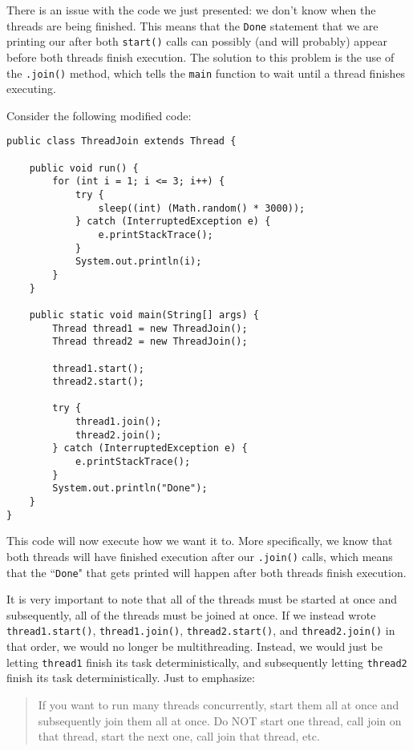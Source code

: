 There is an issue with the code we just presented: we don't know when the threads are being finished. This means that the \verb!Done! statement that we are printing our after both \verb!start()! calls can possibly (and will probably) appear before both threads finish execution. The solution to this problem is the use of the \verb!.join()! method, which tells the \verb!main! function to wait until a thread finishes executing. 

Consider the following modified code:

\begin{lstlisting}
public class ThreadJoin extends Thread {

	public void run() {
		for (int i = 1; i <= 3; i++) {
			try {
				sleep((int) (Math.random() * 3000));
			} catch (InterruptedException e) {
				e.printStackTrace();
			}
			System.out.println(i);
		}
	}

	public static void main(String[] args) {
		Thread thread1 = new ThreadJoin();
		Thread thread2 = new ThreadJoin();

		thread1.start();
		thread2.start();

		try {
			thread1.join();
			thread2.join();
		} catch (InterruptedException e) {
			e.printStackTrace();
		}
		System.out.println("Done");
	}
}
\end{lstlisting}

This code will now execute how we want it to. More specifically, we know that both threads will have finished execution after our \verb!.join()! calls, which means that the ``\verb!Done!" that gets printed will happen after both threads finish execution. 

It is very important to note that all of the threads must be started at once and subsequently, all of the threads must be joined at once. If we instead wrote \verb!thread1.start()!, \verb!thread1.join()!, \verb!thread2.start()!, and \verb!thread2.join()! in that order, we would no longer be multithreading. Instead, we would just be letting \verb!thread1! finish its task deterministically, and subsequently letting \verb!thread2! finish its task deterministically. Just to emphasize:

\begin{quote}
    If you want to run many threads concurrently, start them all at once and subsequently join them all at once. Do NOT start one thread, call join on that thread, start the next one, call join that thread, etc.
\end{quote}


